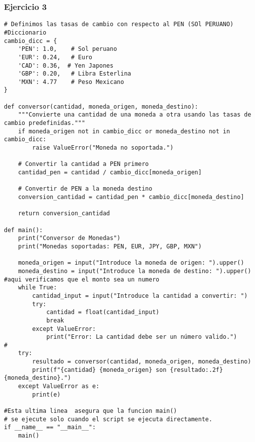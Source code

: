 \documentclass[10pt,a4paper]{article}
\begin{document}
\subsubsection{Ejercicio 3}
\begin{lstlisting}
# Definimos las tasas de cambio con respecto al PEN (SOl PERUANO)
#Diccionario
cambio_dicc = {
    'PEN': 1.0,    # Sol peruano
    'EUR': 0.24,   # Euro
    'CAD': 0.36,  # Yen Japones
    'GBP': 0.20,   # Libra Esterlina
    'MXN': 4.77    # Peso Mexicano
}

def conversor(cantidad, moneda_origen, moneda_destino):
    """Convierte una cantidad de una moneda a otra usando las tasas de cambio predefinidas."""
    if moneda_origen not in cambio_dicc or moneda_destino not in cambio_dicc:
        raise ValueError("Moneda no soportada.")
    
    # Convertir la cantidad a PEN primero
    cantidad_pen = cantidad / cambio_dicc[moneda_origen]
    
    # Convertir de PEN a la moneda destino
    conversion_cantidad = cantidad_pen * cambio_dicc[moneda_destino]
    
    return conversion_cantidad

def main():
    print("Conversor de Monedas")
    print("Monedas soportadas: PEN, EUR, JPY, GBP, MXN")
    
    moneda_origen = input("Introduce la moneda de origen: ").upper()
    moneda_destino = input("Introduce la moneda de destino: ").upper()
#aqui verificamos que el monto sea un numero    
    while True:
        cantidad_input = input("Introduce la cantidad a convertir: ")
        try:
            cantidad = float(cantidad_input)
            break
        except ValueError:
            print("Error: La cantidad debe ser un número valido.")
#
    try:
        resultado = conversor(cantidad, moneda_origen, moneda_destino)
        print(f"{cantidad} {moneda_origen} son {resultado:.2f} {moneda_destino}.")
    except ValueError as e:
        print(e)

#Esta ultima linea  asegura que la funcion main() 
# se ejecute solo cuando el script se ejecuta directamente.
if __name__ == "__main__":
    main()

\end{lstlisting}
\end{document}
